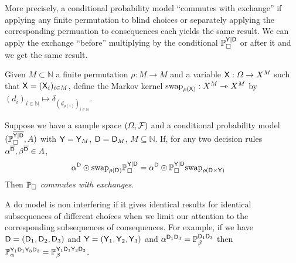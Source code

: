 
More precisely, a conditional probability model ``commutes with exchange'' if applying any finite permutation to blind choices or separately applying the corresponding permuation to consequences each yields the same result. We can apply the exchange ``before'' multiplying by the conditional $\mathbb{P}_{\square}^{\mathsf{Y}|\mathsf{D}}$ or after it and we get the same result.

\begin{definition}
Given $M\subset \mathbb{N}$ a finite permutation $\rho:M\to M$ and a variable $\mathsf{X}:\Omega\to X^M$ such that $\mathsf{X}=(\mathsf{X}_i)_{i\in M}$, define the Markov kernel $\text{swap}_{\rho(\mathsf{X})}:X^M\rightarrowtriangle X^M$ by $(d_i)_{i\in\mathbb{N}}\mapsto \delta_{(d_{\rho(i)})_{i\in\mathbb{N}}}$.
\end{definition}

\begin{definition}\label{def:caus_exch}
Suppose we have a sample space $(\Omega,\mathcal{F})$ and a conditional probability model $(\mathbb{P}_{\square}^{\overline{\mathsf{Y}|\mathsf{D}}},A)$ with $\mathsf{Y}=\mathsf{Y}_M$, $\mathsf{D}=\mathsf{D}_M$, $M\subseteq \mathbb{N}$. If, for any two decision rules $\alpha^{\overline{\mathsf{D}}},\beta^{\overline{\mathsf{D}}} \in A$,
\begin{align}
    \alpha^{\mathsf{D}}\odot \text{swap}_{\rho(\mathsf{D})} \mathbb{P}_{\square}^{\mathsf{Y}|\mathsf{D}} &= \alpha^{\mathsf{D}}\odot \mathbb{P}_{\square}^{\mathsf{Y}|\mathsf{D}}\text{swap}_{\rho(\mathsf{D}\times \mathsf{Y})}
\end{align}
Then $\mathbb{P}_\square$ \emph{commutes with exchanges}.
\end{definition}

A do model is non interfering if it gives identical results for identical subsequences of different choices when we limit our attention to the corresponding subsequences of consequences. For example, if we have $\mathsf{D}=(\mathsf{D}_1,\mathsf{D}_2,\mathsf{D}_3)$ and $\mathsf{Y}=(\mathsf{Y}_1,\mathsf{Y}_2,\mathsf{Y}_3)$ and $\alpha^{\mathsf{D}_1\mathsf{D}_3}=\mathbb{P}_\beta^{\mathsf{D}_1\mathsf{D}_3}$ then $\mathbb{P}_{\alpha}^{\mathsf{Y}_1\mathsf{D}_1\mathsf{Y}_3\mathsf{D}_3}=\mathbb{P}_\beta^{\mathsf{Y}_1\mathsf{D}_1\mathsf{Y}_3\mathsf{D}_3}$.

